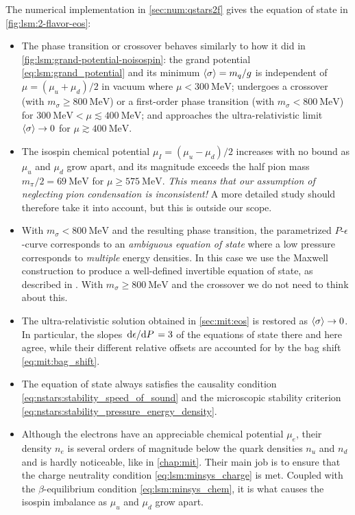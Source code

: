 \pagebreak
The numerical implementation in \cref{sec:num:qstars2f}
gives the equation of state in \cref{fig:lsm:2-flavor-eos}:
\begin{itemize}
\item The phase transition or crossover behaves similarly to how it did in \cref{fig:lsm:grand-potential-noisospin}:
      the grand potential \eqref{eq:lsm:grand_potential} and its minimum $\langle \sigma \rangle=m_q/g$ is independent of $\mu=(\mu_u+\mu_d)/2$ in vacuum where $\mu < \SI{300}{\mega\electronvolt}$;
      undergoes a crossover (with $m_\sigma \geq \SI{800}{\mega\electronvolt}$) or a first-order phase transition (with $m_\sigma < \SI{800}{\mega\electronvolt}$) for $\SI{300}{\mega\electronvolt} < \mu \lesssim \SI{400}{\mega\electronvolt}$;
      and approaches the ultra-relativistic limit $\langle \sigma \rangle\rightarrow 0$ for $\mu \gtrsim \SI{400}{\mega\electronvolt}$.
\item The isospin chemical potential $\mu_I=(\mu_u-\mu_d)/2$ increases with no bound as $\mu_u$ and $\mu_d$ grow apart,
      and its magnitude exceeds the half pion mass $m_\pi/2 = \SI{69}{\mega\electronvolt}$ for $\mu \geq \SI{575}{\mega\electronvolt}$.
      \emph{This means that our assumption of neglecting pion condensation is inconsistent!}
      A more detailed study should therefore take it into account, but this is outside our scope.
\item With $m_\sigma < \SI{800}{\mega\electronvolt}$ and the resulting phase transition,
      the parametrized $P$-$\epsilon$-curve corresponds to an \emph{ambiguous equation of state}
      where a low pressure corresponds to \emph{multiple} energy densities.
      In this case we use the Maxwell construction to produce a well-defined invertible equation of state,
      as described in \cite[equation (4.69)]{ref:master_francesco}.
      With $m_\sigma \geq \SI{800}{\mega\electronvolt}$ and the crossover we do not need to think about this.
\item The ultra-relativistic solution obtained in \cref{sec:mit:eos} is restored as $\langle \sigma \rangle \rightarrow 0$.
      In particular, the slopes $\odv{\epsilon}/{P} = 3$ of the equations of state there and here agree,
      while their different relative offsets are accounted for by the bag shift \eqref{eq:mit:bag_shift}.
\item The equation of state always satisfies the causality condition \eqref{eq:nstars:stability_speed_of_sound}
      and the microscopic stability criterion \eqref{eq:nstars:stability_pressure_energy_density}.
\item Although the electrons have an appreciable chemical potential $\mu_e$,
      their density $n_e$ is several orders of magnitude below the quark densities $n_u$ and $n_d$ and is hardly noticeable,
      like in \cref{chap:mit}.
      Their main job is to ensure that the charge neutrality condition \eqref{eq:lsm:minsys_charge} is met.
      Coupled with the $\beta$-equilibrium condition \eqref{eq:lsm:minsys_chem},
      it is what causes the isospin imbalance as $\mu_u$ and $\mu_d$ grow apart.
\end{itemize}

